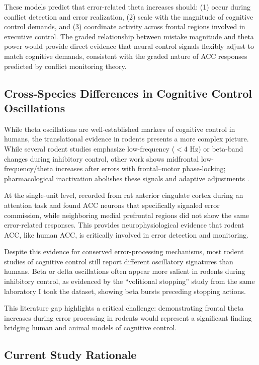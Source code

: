 \documentclass[11pt]{article}
\begin{document}
These models predict that error-related theta increases should: (1) occur during conflict detection and error realization, (2) scale with the magnitude of cognitive control demands, and (3) coordinate activity across frontal regions involved in executive control. The graded relationship between mistake magnitude and theta power would provide direct evidence that neural control signals flexibly adjust to match cognitive demands, consistent with the graded nature of ACC responses predicted by conflict monitoring theory.

\subsection{Cross-Species Differences in Cognitive Control Oscillations}

While theta oscillations are well-established markers of cognitive control in humans, the translational evidence in rodents presents a more complex picture. While several rodent studies emphasize low-frequency ($<$4 Hz) or beta-band changes during inhibitory control, other work shows midfrontal low-frequency/theta increases after errors with frontal–motor phase-locking; pharmacological inactivation abolishes these signals and adaptive adjustments \citep{narayanan2013common}.

At the single-unit level, \citet{totah2009anterior} recorded from rat anterior cingulate cortex during an attention task and found ACC neurons that specifically signaled error commission, while neighboring medial prefrontal regions did not show the same error-related responses. This provides neurophysiological evidence that rodent ACC, like human ACC, is critically involved in error detection and monitoring.

Despite this evidence for conserved error-processing mechanisms, most rodent studies of cognitive control still report different oscillatory signatures than humans. Beta or delta oscillations often appear more salient in rodents during inhibitory control, as evidenced by the ``volitional stopping'' study from the same laboratory I took the dataset, showing beta bursts preceding stopping actions.

This literature gap highlights a critical challenge: demonstrating frontal theta increases during error processing in rodents would represent a significant finding bridging human and animal models of cognitive control.

\subsection{Current Study Rationale}
\end{document}
